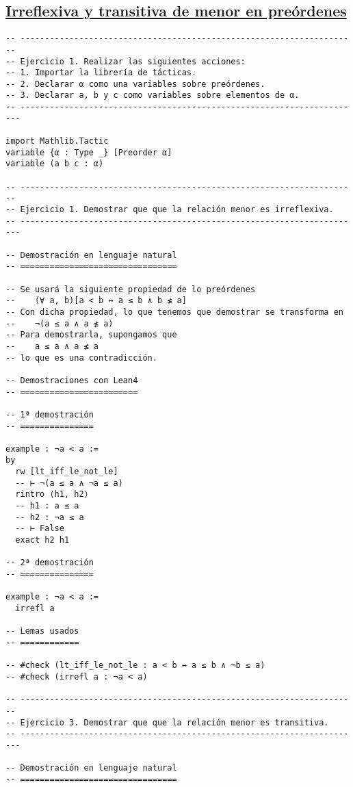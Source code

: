 \subsection{\href{./src/Logica/Irreflexiva\_y\_transitiva\_de\_menor\_en\_preordenes.lean}{Irreflexiva y transitiva de menor en preórdenes}}
\label{sec:org1652287}
\begin{verbatim}
-- ---------------------------------------------------------------------
-- Ejercicio 1. Realizar las siguientes acciones:
-- 1. Importar la librería de tácticas.
-- 2. Declarar α como una variables sobre preórdenes.
-- 3. Declarar a, b y c como variables sobre elementos de α.
-- ----------------------------------------------------------------------

import Mathlib.Tactic
variable {α : Type _} [Preorder α]
variable (a b c : α)

-- ---------------------------------------------------------------------
-- Ejercicio 1. Demostrar que que la relación menor es irreflexiva.
-- ----------------------------------------------------------------------

-- Demostración en lenguaje natural
-- ================================

-- Se usará la siguiente propiedad de lo preórdenes
--    (∀ a, b)[a < b ↔ a ≤ b ∧ b ≰ a]
-- Con dicha propiedad, lo que tenemos que demostrar se transforma en
--    ¬(a ≤ a ∧ a ≰ a)
-- Para demostrarla, supongamos que
--    a ≤ a ∧ a ≰ a
-- lo que es una contradicción.

-- Demostraciones con Lean4
-- ========================

-- 1ª demostración
-- ===============

example : ¬a < a :=
by
  rw [lt_iff_le_not_le]
  -- ⊢ ¬(a ≤ a ∧ ¬a ≤ a)
  rintro ⟨h1, h2⟩
  -- h1 : a ≤ a
  -- h2 : ¬a ≤ a
  -- ⊢ False
  exact h2 h1

-- 2ª demostración
-- ===============

example : ¬a < a :=
  irrefl a

-- Lemas usados
-- ============

-- #check (lt_iff_le_not_le : a < b ↔ a ≤ b ∧ ¬b ≤ a)
-- #check (irrefl a : ¬a < a)

-- ---------------------------------------------------------------------
-- Ejercicio 3. Demostrar que que la relación menor es transitiva.
-- ----------------------------------------------------------------------

-- Demostración en lenguaje natural
-- ================================


\end{verbatim}
